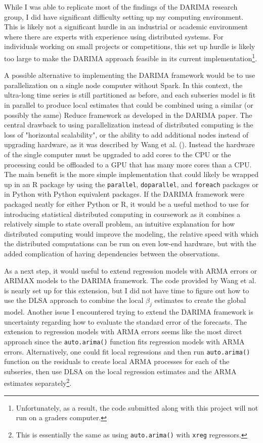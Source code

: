 \documentclass[
]{article}
\begin{document}
While I was able to replicate most of the findings of the DARIMA research group, I did have significant difficulty setting up my computing environment. This is likely not a significant hurdle in an industrial or academic environment where there are experts with experience using distributed systems. For individuals working on small projects or competitions, this set up hurdle is likely too large to make the DARIMA approach feasible in its current implementation\footnote{Unfortunately, as a result, the code submitted along with this project will not run on a graders computer.}.

A possible alternative to implementing the DARIMA framework would be to use parallelization on a single node computer without Spark. In this context, the ultra-long time series is still partitioned as before, and each subseries model is fit in parallel to produce local estimates that could be combined using a similar (or possibly the same) Reduce framework as developed in the DARIMA paper. The central drawback to using parallelization instead of distributed computing is the loss of "horizontal scalability", or the ability to add additional nodes instead of upgrading hardware, as it was described by Wang et al. (\cite*[p.~5]{wang_distributed_2020}). Instead the hardware of the single computer must be upgraded to add cores to the CPU or the processing could be offloaded to a GPU that has many more cores than a CPU. The main benefit is the more simple implementation that could likely be wrapped up in an R package by using the \texttt{parallel}, \texttt{doparallel}, and \texttt{foreach} packages or in Python with Python equivalent packages. If the DARIMA framework were packaged neatly for either Python or R, it would be a useful method to use for introducing statistical distributed computing in coursework as it combines a relatively simple to state overall problem, an intuitive explanation for how distributed computing would improve the modeling, the relative speed with which the distributed computations can be run on even low-end hardware, but with the added complication of having dependencies between the observations. 

As a next step, it would useful to extend regression models with ARMA errors or ARIMAX models to the DARIMA framework. The code provided by Wang et al. is nearly set up for this extension, but I did not have time to figure out how to use the DLSA approach to combine the local $\beta_j$ estimates to create the global model. Another issue I encountered trying to extend the DARIMA framework is uncertainty regarding how to evaluate the standard error of the forecasts. The extension to regression models with ARMA errors seems like the most direct approach since the \texttt{auto.arima()} function fits regression models with ARMA errors. Alternatively, one could fit local regressions and then run \texttt{auto.arima()} function on the residuals to create local ARMA processes for each of the subseries, then use DLSA on the local regression estimates and the ARMA estimates separately\footnote{This is essentially the same as using \texttt{auto.arima()} with \texttt{xreg} regressors.}. 
\end{document}
